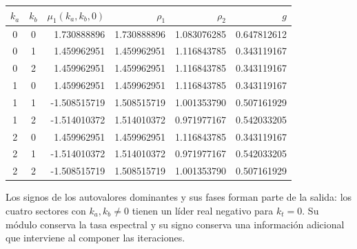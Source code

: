 \begin{center}
\small
\begin{tabular}{ccrrrr}
\toprule
$k_a$&$k_b$&$\mu_1(k_a,k_b,0)$&$\rho_1$&$\rho_2$&$g$\\
\midrule
0&0&1.730888896&1.730888896&1.083076285&0.647812612\\
0&1&1.459962951&1.459962951&1.116843785&0.343119167\\
0&2&1.459962951&1.459962951&1.116843785&0.343119167\\
1&0&1.459962951&1.459962951&1.116843785&0.343119167\\
1&1&-1.508515719&1.508515719&1.001353790&0.507161929\\
1&2&-1.514010372&1.514010372&0.971977167&0.542033205\\
2&0&1.459962951&1.459962951&1.116843785&0.343119167\\
2&1&-1.514010372&1.514010372&0.971977167&0.542033205\\
2&2&-1.508515719&1.508515719&1.001353790&0.507161929\\
\bottomrule
\end{tabular}
\end{center}

Los signos de los autovalores dominantes y sus fases forman parte de la
salida: los cuatro sectores con $k_a,k_b\ne0$ tienen un líder real negativo
para $k_t=0$. Su módulo conserva la tasa espectral y su signo conserva una
información adicional que interviene al componer las iteraciones.

